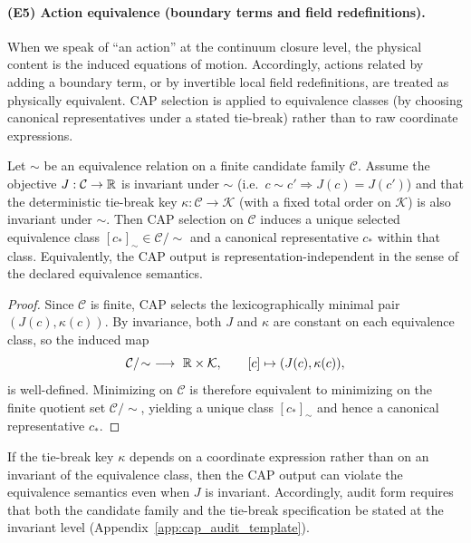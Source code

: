 \paragraph{(E5) Action equivalence (boundary terms and field redefinitions).}
\InterfaceTag When we speak of ``an action'' at the continuum closure level, the physical content is the induced equations of motion.
Accordingly, actions related by adding a boundary term, or by invertible local field redefinitions, are treated as physically equivalent.
CAP selection is applied to equivalence classes (by choosing canonical representatives under a stated tie-break) rather than to raw coordinate expressions.
%
\begin{proposition}\label{prop:cap_on_equiv_classes}
\AuditTag Let $\sim$ be an equivalence relation on a finite candidate family $\mathcal{C}$.
Assume the objective $J:\mathcal{C}\to\mathbb{R}$ is invariant under $\sim$ (i.e.\ $c\sim c'\Rightarrow J(c)=J(c')$) and that the deterministic tie-break key $\kappa:\mathcal{C}\to\mathcal{K}$ (with a fixed total order on $\mathcal{K}$) is also invariant under $\sim$.
Then CAP selection on $\mathcal{C}$ induces a unique selected equivalence class $[c_\ast]_\sim\in \mathcal{C}/\!\sim$ and a canonical representative $c_\ast$ within that class.
Equivalently, the CAP output is representation-independent in the sense of the declared equivalence semantics.
\end{proposition}
\begin{proof}
Since $\mathcal{C}$ is finite, CAP selects the lexicographically minimal pair $(J(c),\kappa(c))$.
By invariance, both $J$ and $\kappa$ are constant on each equivalence class, so the induced map
\[
\mathcal{C}/\!\sim\ \longrightarrow\ \RR\times\mathcal{K},\qquad [c]\mapsto (J(c),\kappa(c)),
\]
is well-defined.
Minimizing on $\mathcal{C}$ is therefore equivalent to minimizing on the finite quotient set $\mathcal{C}/\!\sim$, yielding a unique class $[c_\ast]_\sim$ and hence a canonical representative $c_\ast$.
\end{proof}
\begin{remark}\label{rem:cap_equiv_audit_failure}
\AuditTag If the tie-break key $\kappa$ depends on a coordinate expression rather than on an invariant of the equivalence class, then the CAP output can violate the equivalence semantics even when $J$ is invariant.
Accordingly, audit form requires that both the candidate family and the tie-break specification be stated at the invariant level (Appendix~\ref{app:cap_audit_template}).
\end{remark}

